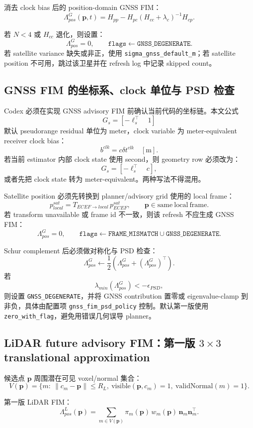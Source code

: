 \documentclass[11pt,a4paper]{article}
\newcommand{\Lam}{\Lambda}
\newcommand{\pvec}{\mathbf{p}}
\newcommand{\nm}{\mathbf{n}}
\begin{document}
消去 clock bias 后的 position-domain GNSS FIM：
\[
  \boxed{
    \Lam^G_{pos}(\pvec,t)=H_{pp}-H_{pc}(H_{cc}+\lambda_c)^{-1}H_{cp}.
  }
\]

若 $N<4$ 或 $H_{cc}$ 退化，则设置：
\[
  \Lam^G_{pos}=0,
  \qquad
  \texttt{flags} \leftarrow \texttt{GNSS\_DEGENERATE}.
\]
若 satellite variance 缺失或非正，使用 \texttt{sigma\_gnss\_default\_m}；若 satellite position 不可用，跳过该卫星并在 refresh log 中记录 skipped count。


\subsection{GNSS FIM 的坐标系、clock 单位与 PSD 检查}

Codex 必须在实现 GNSS advisory FIM 前确认当前代码的坐标链。本文公式
\[
  G_s=[-\ell_s^\top\quad 1]
\]
默认 pseudorange residual 单位为 meter，clock variable 为 meter-equivalent receiver clock bias：
\[
  b^{clk}=c\delta t^{clk}\quad [\mathrm{m}].
\]
若当前 estimator 内部 clock state 使用 second，则 geometry row 必须改为：
\[
  G_s=[-\ell_s^\top\quad c],
\]
或者先把 clock state 转为 meter-equivalent。两种写法不得混用。

Satellite position 必须先转换到 planner/advisory grid 使用的 local frame：
\[
  p^{sat}_{local}=T_{ECEF\rightarrow local}\,p^{sat}_{ECEF},
  \qquad
  \pvec\in\mathrm{same\ local\ frame}.
\]
若 transform unavailable 或 frame id 不一致，则该 refresh 不应生成 GNSS FIM：
\[
  \Lam^G_{pos}=0,
  \qquad
  \texttt{flags}\leftarrow\texttt{FRAME\_MISMATCH}\cup\texttt{GNSS\_DEGENERATE}.
\]

Schur complement 后必须做对称化与 PSD 检查：
\[
  \Lam^G_{pos}\leftarrow\frac{1}{2}\left(\Lam^G_{pos}+(\Lam^G_{pos})^\top\right).
\]
若
\[
  \lambda_{min}(\Lam^G_{pos})<-\epsilon_{PSD},
\]
则设置 \texttt{GNSS\_DEGENERATE}，并将 GNSS contribution 置零或 eigenvalue-clamp 到非负，具体由配置项 \texttt{gnss\_fim\_psd\_policy} 控制。默认第一版使用 \texttt{zero\_with\_flag}，避免用错误几何误导 planner。

\subsection{LiDAR future advisory FIM：第一版 \texorpdfstring{$3\times3$}{3x3} translational approximation}

候选点 $\pvec$ 周围潜在可见 voxel/normal 集合：
\[
  V(\pvec)=\{m:\ \|c_m-\pvec\|\le R_L,\ \mathrm{visible}(\pvec,c_m)=1,\ \mathrm{validNormal}(m)=1\}.
\]

第一版 LiDAR FIM：
\[
  \boxed{
    \Lam^L_{pos}(\pvec)
    =
    \sum_{m\in V(\pvec)}
    \pi_m(\pvec)\,w_m(\pvec)\,\nm_m\nm_m^\top.
  }
\]
\end{document}
